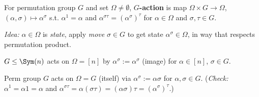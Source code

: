 \begin{slide}
    \begin{definition}
        \vspace{0pt}
        For permutation group $G$ and set $\Omega \neq \emptyset$, \textbf{$G$-action} is map $\Omega \times G \to \Omega$, $(\alpha,\sigma) \mapsto \alpha^\sigma$ s.t. $\alpha^1 = \alpha$ and $\alpha^{\sigma\tau} = (\alpha^\sigma)^\tau$ for $\alpha \in \Omega$ and $\sigma,\tau \in G$.
    \end{definition}

    \textit{Idea:} $\alpha \in \Omega$ is \textit{state}, apply \textit{move} $\sigma \in G$ to get state $\alpha^\sigma \in \Omega$, in way that respects permutation product. \pause

    \begin{example}
        \vspace{0pt}
        $G \leq \Sym(n)$ acts on $\Omega = [n]$ by $\alpha^\sigma := \alpha^\sigma$ (image) for $\alpha \in [n]$, $\sigma \in G$.
    \end{example} \pause

    \begin{example}
        \vspace{0pt}
        Perm group $G$ acts on $\Omega = G$ (itself) via $\alpha^\sigma := \alpha\sigma$ for $\alpha,\sigma \in G$. (\textit{Check:} $\alpha^1 = \alpha 1 = \alpha$ and $\alpha^{\sigma\tau} = \alpha(\sigma\tau) = (\alpha\sigma)\tau = (\alpha^\sigma)^\tau$.)
    \end{example}
\end{slide}

